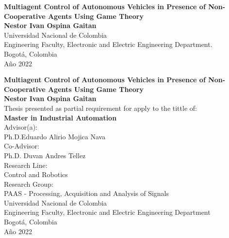 
\begin{center}
\begin{figure}
\centering%
%
\end{figure}
\thispagestyle{empty} \vspace*{2.0cm} \textbf{\huge
Multiagent Control of Autonomous Vehicles in Presence of Non-Cooperative Agents Using
Game Theory}\\[5.0cm]
\Large\textbf{Nestor Ivan Ospina Gaitan}\\[5.0cm]
\small Universidad Nacional de Colombia\\
Engineering Faculty, Electronic and Electric Engineering Department.\\
Bogotá, Colombia\\
A\~{n}o 2022\\
\end{center}


\newpage
\begin{center}
\thispagestyle{empty} \vspace*{0cm} \textbf{\huge
Multiagent Control of Autonomous Vehicles in Presence of Non-Cooperative Agents Using
Game Theory}\\[3.0cm]
\Large\textbf{Nestor Ivan Ospina Gaitan}\\[2.0cm]
\small Thesis presented as partial requirement for apply to the tittle of:\\
\textbf{Master in Industrial Automation}\\[2cm]
Advisor(a):\\
Ph.D.Eduardo Alirio Mojica Nava\\
Co-Advisor:\\
Ph.D. Duvan Andres Tellez\\[2.0cm]
Research Line:\\
Control and Robotics\\
Research Group:\\
PAAS - Processing, Acquisition and Analysis of Signals\\[1.5cm]
Universidad Nacional de Colombia\\
Engineering Faculty, Electronic and Electric Engineering Department\\
Bogotá, Colombia\\
A\~{n}o 2022\\
\end{center}

